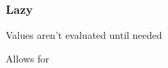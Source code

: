 \begin{frame}
  \frametitle{Lazy}

  Values aren't evaluated until needed

  Allows for
\end{frame}
